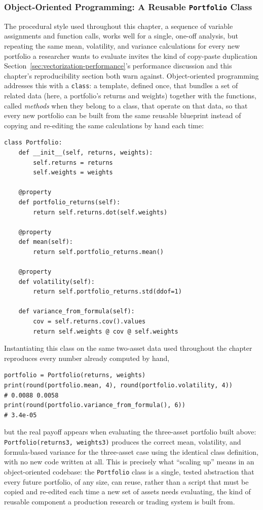 \documentclass[../ai_in_finance]{subfiles}
\begin{document}
\subsubsection*{Object-Oriented Programming: A Reusable \texttt{Portfolio} Class}

The procedural style used throughout this chapter, a sequence of variable assignments and function calls, works well for a single, one-off analysis, but repeating the same mean, volatility, and variance calculations for every new portfolio a researcher wants to evaluate invites the kind of copy-paste duplication Section~\ref{sec:vectorization-performance}'s performance discussion and this chapter's reproducibility section both warn against.
Object-oriented programming addresses this with a \texttt{class}: a template, defined once, that bundles a set of related data (here, a portfolio's returns and weights) together with the functions, called \emph{methods} when they belong to a class, that operate on that data, so that every new portfolio can be built from the same reusable blueprint instead of copying and re-editing the same calculations by hand each time:

\begin{verbatim}
class Portfolio:
    def __init__(self, returns, weights):
        self.returns = returns
        self.weights = weights

    @property
    def portfolio_returns(self):
        return self.returns.dot(self.weights)

    @property
    def mean(self):
        return self.portfolio_returns.mean()

    @property
    def volatility(self):
        return self.portfolio_returns.std(ddof=1)

    def variance_from_formula(self):
        cov = self.returns.cov().values
        return self.weights @ cov @ self.weights
\end{verbatim}

Instantiating this class on the same two-asset data used throughout the chapter reproduces every number already computed by hand,
\begin{verbatim}
portfolio = Portfolio(returns, weights)
print(round(portfolio.mean, 4), round(portfolio.volatility, 4))
# 0.0088 0.0058
print(round(portfolio.variance_from_formula(), 6))
# 3.4e-05
\end{verbatim}
but the real payoff appears when evaluating the three-asset portfolio built above: \texttt{Portfolio(returns3, weights3)} produces the correct mean, volatility, and formula-based variance for the three-asset case using the identical class definition, with no new code written at all.
This is precisely what ``scaling up'' means in an object-oriented codebase: the \texttt{Portfolio} class is a single, tested abstraction that every future portfolio, of any size, can reuse, rather than a script that must be copied and re-edited each time a new set of assets needs evaluating, the kind of reusable component a production research or trading system is built from.
\end{document}
